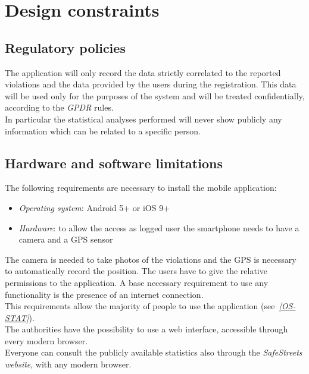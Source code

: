 \documentclass[a4paper]{report}
\begin{document}
\section{Design constraints}
\subsection{Regulatory policies}
The application will only record the data strictly correlated to the reported violations and the data provided by the users during the registration. This data will be used only for the purposes of the system and will be treated confidentially, according to the \textit{GPDR} rules.\\
In particular the statistical analyses performed will never show publicly any information which can be related to a specific person.
\subsection{Hardware and software limitations}
The following requirements are necessary to install the mobile application:
\begin{itemize}
\item \textit{Operating system}: Android 5+ or iOS 9+
\item \textit{Hardware}: to allow the access as logged user the smartphone needs to have a camera and a GPS sensor
\end{itemize}
The camera is needed to take photos of the violations and the GPS is necessary to automatically record the position. The users have to give the relative permissions to the application. A base necessary requirement to use any functionality is the presence of an internet connection.\\
This requirements allow the majority of people to use the application \label{use:os-stats}  \mbox{(see \hyperref[ref:os-stats]{\textit{[OS-STAT]}}).}\\
The authorities have the possibility to use a web interface, accessible through every modern browser.\\
Everyone can consult the publicly available statistics also through the \textit{SafeStreets website}, with any modern browser.
\end{document}
